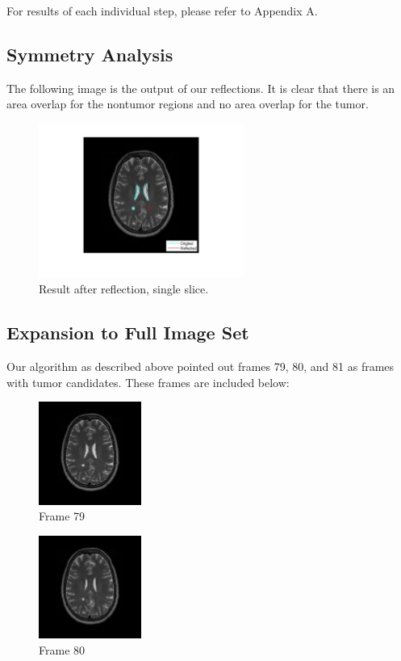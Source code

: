 \documentclass[12pt]{article}
\theoremstyle{plain}%
\theoremstyle{definition}
\theoremstyle{remark}
\begin{document}
For results of each individual step, please refer to Appendix A.

\subsection{Symmetry Analysis}
The following image is the output of our reflections. It is clear that there is an area overlap for the nontumor regions and no area overlap for the tumor.

\begin{figure}[!h]
	\centering
		\includegraphics[width=0.6\textwidth]{reflection.jpg}
	\caption{Result after reflection, single slice.}
\end{figure}


\subsection{Expansion to Full Image Set}
Our algorithm as described above pointed out frames 79, 80, and 81 as frames with tumor candidates. These frames are included below:
\begin{figure}[!h]
	\centering
		\includegraphics[width=0.3\textwidth]{79.jpg}
	\caption{Frame 79}
\end{figure}

\begin{figure}[!h]
	\centering
		\includegraphics[width=0.3\textwidth]{80.jpg}
	\caption{Frame 80}
\end{figure}
\end{document}
